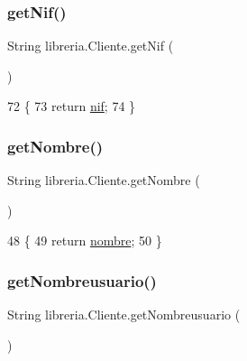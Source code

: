 \subsubsection{\texorpdfstring{get\+Nif()}{getNif()}}
{\footnotesize\ttfamily String libreria.\+Cliente.\+get\+Nif (\begin{DoxyParamCaption}{ }\end{DoxyParamCaption})\hspace{0.3cm}{\ttfamily [inline]}}


\begin{DoxyCode}
72                            \{
73         \textcolor{keywordflow}{return} \mbox{\hyperlink{classlibreria_1_1_cliente_a6d50af0b6448c8ac66e9ae08c436cdfe}{nif}};
74     \}
\end{DoxyCode}
\mbox{\label{classlibreria_1_1_cliente_a4d318e045a10b2b77ef640e66c99e15c}} 
\subsubsection{\texorpdfstring{get\+Nombre()}{getNombre()}}
{\footnotesize\ttfamily String libreria.\+Cliente.\+get\+Nombre (\begin{DoxyParamCaption}{ }\end{DoxyParamCaption})\hspace{0.3cm}{\ttfamily [inline]}}


\begin{DoxyCode}
48                               \{
49         \textcolor{keywordflow}{return} \mbox{\hyperlink{classlibreria_1_1_cliente_ab7862ac1d181becc7cf8a88ecf07b570}{nombre}};
50     \}
\end{DoxyCode}
\mbox{\label{classlibreria_1_1_cliente_a8456709fe1bc5fe72550413bb38b2ce3}} 
\subsubsection{\texorpdfstring{get\+Nombreusuario()}{getNombreusuario()}}
{\footnotesize\ttfamily String libreria.\+Cliente.\+get\+Nombreusuario (\begin{DoxyParamCaption}{ }\end{DoxyParamCaption})\hspace{0.3cm}{\ttfamily [inline]}}


